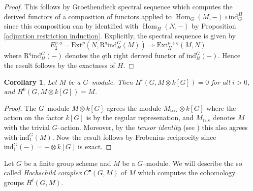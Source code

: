\documentclass{article}
\theoremstyle{plain}
\newtheorem{Cor}[Th]{Corollary}
\theoremstyle{definition}
\DeclareMathOperator{\Hom}{Hom}
\begin{document}
\begin{proof}
    This follows by Groethendieck spectral sequence which computes the derived functors of a composition of functors applied to $\Hom_G(M,-)\circ \mathrm{ind}_G^H$ since  this composition can by identified with $\Hom_H(N,-)$ by Proposition \ref{adjuntion restriction induction}. Explicitly, the spectral sequence is given by 
    \[
    E^{p,q}_2= \mathrm{Ext}^p(N, \mathrm{R}^q\mathrm{ind}_H^G(M))\Rightarrow \mathrm{Ext}^{p+q}_H(M,N)
    \]
    where $\mathrm{R}^q\mathrm{ind}_H^G(-)$ denotes the $q$th right derived functor of $\mathrm{ind}_H^G(-)$. Hence the result follows by the exactness of $H$. 
\end{proof}



\begin{Cor}\label{vanishing of cohomology for induced modules}
    Let $M$ be a $G$--module. Then $H^i(G,M\otimes k[G])=0$ for all $i>0$, and $H^0(G,M\otimes k[G])=M$.  
\end{Cor}

\begin{proof}
    The $G$--module $M\otimes k[G]$ agrees the module $M_{\textrm{triv}}\otimes k[G]$ where the action on the factor $k[G]$ is by the regular represenation, and $M_\textrm{triv}$ denotes $M$ with the trivial $G$--action. Moreover, by the \textit{tensor identity} (see \cite[Proposition I.3.6]{jantzen2003representations}) this also agrees with  $\mathrm{ind}_1^G(M)$. Now the result follows by Frobenius reciprocity since $\mathrm{ind}_1^G(-)=-\otimes k[G]$ is exact. 
\end{proof}


Let $G$ be a finite group scheme and $M$ be a $G$--module. We will describe the so called \textit{Hochschild complex} $C^\bullet(G,M)$  of $M$  which computes the cohomology groups $H^i(G,M)$.
\end{document}
